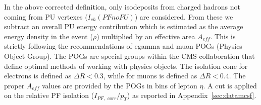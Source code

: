 In the above corrected definition, only isodeposits from charged hadrons not coming from PU vertexes ($I_{ch}(PFnoPU)$) are considered.  From these we subtract an overall PU energy contribution which is estimated as the average energy density in the event ($\rho$) multiplied by an effective area $A_{eff}$. This is strictly following the recommendations of egamma and muon POGs (Physics Object Group). The POGs are special groups within the CMS collaboration that define optimal methods of working with physics objects. The isolation cone for electrons is defined as $\Delta R < 0.3$, while for muons is defined as $\Delta R < 0.4$. The proper $A_{eff}$ values are provided by the POGs in bins of lepton $\eta$. A cut is applied on the relative PF isolation ($I_{PF, \,\, corr} / p_T$) as reported in Appendix~\ref{sec:datamcsf}.




